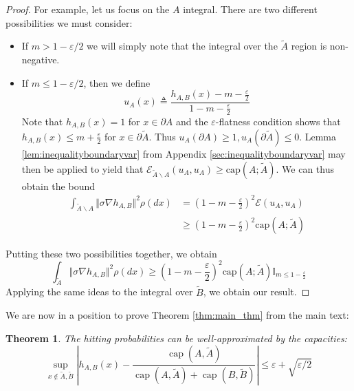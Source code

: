 \documentclass[english, aip, jcp, priprint, graphicx,floatfix]{revtex4-1}
\newtheorem{theorem}{Theorem}
\theoremstyle{plain}
\theoremstyle{definition}
\theoremstyle{plain}
\newcommand{\indicatorf}[1]{\mathbb{I}_{#1}}
\newcommand{\capac}[2]{\mathrm{cap}\left(#1;#2\right)}
\begin{document}
\begin{proof}
For example, let us focus on the $A$ integral.  There are two different possibilities we must consider:
\begin{itemize}
\item If $m>1-\varepsilon/2$ we will simply note that the integral over the $\tilde A$ region is non-negative.  
\item If $m\leq 1-\varepsilon/2$, then we define
    \[
    u_A (x) \triangleq \frac{h_{A,B} (x) - m - \frac{\varepsilon}{2}}{1 - m - \frac{\varepsilon}{2}}
    \]
    Note that  $h_{A,B}(x)=1$ for $x \in \partial A$ and the $\varepsilon$-flatness condition shows that $h_{A,B}(x) \leq m + \frac {\varepsilon}{2}$ for $x \in \partial \tilde A$.  Thus $u_A(\partial A)\geq1,u_A(\partial \tilde A)\leq 0$.  Lemma \ref{lem:inequalityboundaryvar} from Appendix \ref{sec:inequalityboundaryvar} may then be applied to yield that $\mathscr{E}_{\tilde A \backslash A}(u_A,u_A) \geq \capac{A}{\tilde A}$.  We can thus obtain the bound
    \begin{align*}
    \int_{\tilde A \backslash A} \Vert \sigma \nabla h_{A,B}\Vert^2 \rho(dx) 
         &= \left(1 - m - \frac{\varepsilon}{2}\right)^2 \mathscr{E}(u_A,u_A)\\
         &\geq \left(1 - m - \frac{\varepsilon}{2}\right)^2 \capac{A}{\tilde A}
    \end{align*}
\end{itemize}
Putting these two possibilities together, we obtain
\[
\int_{\tilde A} \Vert \sigma \nabla h_{A,B}\Vert^2 \rho(dx) \geq \left(1 - m - \frac{\varepsilon}{2}\right)^2 \capac{A}{\tilde A}\indicatorf{m\leq 1-\frac{\varepsilon}{2}}
\]
Applying the same ideas to the integral over $\tilde B$, we obtain our result.
\end{proof}


We are now in a position to prove Theorem \ref{thm:main_thm} from the main text:

\begingroup
\def\thetheorem{\ref{thm:main_thm}}
\begin{theorem}  The hitting probabilities can be well-approximated by the capacities:
\[ \sup_{x \notin \tilde A,\tilde B} \left| h_{A,B} (x) - \frac{\ensuremath{\operatorname{cap}} (A,
\tilde{A})}{\ensuremath{\operatorname{cap}} (A, \tilde{A})
+\ensuremath{\operatorname{cap}} (B, \tilde{B})} \right| \leqslant \varepsilon + \sqrt{\varepsilon/2} \]
\end{theorem}
\addtocounter{theorem}{-1}
\endgroup
\end{document}
